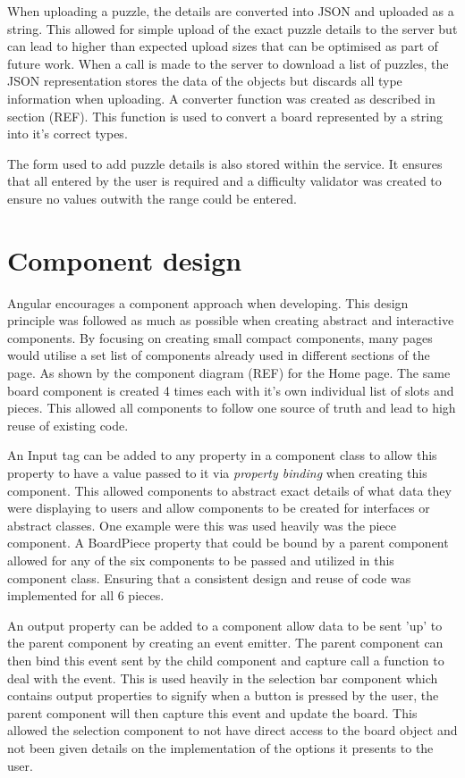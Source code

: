 \documentclass{l4proj}
\begin{document}
When uploading a puzzle, the details are converted into JSON and uploaded as a string. This allowed for simple upload of the exact puzzle details to the server but can lead to higher than expected upload sizes that can be optimised as part of future work. When a call is made to the server to download a list of puzzles, the JSON representation stores the data of the objects but discards all type information when uploading. A converter function was created as described in section (REF). This function is used to convert a board represented by a string into it's correct types.

The form used to add puzzle details is also stored within the service. It ensures that all entered by the user is required and a difficulty validator was created to ensure no values outwith the range could be entered. 

\section{Component design}
Angular encourages a component approach when developing. This design principle was followed as much as possible when creating abstract and interactive components. By focusing on creating small compact components, many pages would utilise a set list of components already used in different sections of the page. As shown by the component diagram (REF) for the Home page. The same board component is created 4 times each with it's own individual list of slots and pieces. This allowed all components to follow one source of truth and lead to high reuse of existing code. 

An Input tag can be added to any property in a component class to allow this property to have a value passed to it via \emph{property binding} when creating this component. This allowed components to abstract exact details of what data they were displaying to users and allow components to be created for interfaces or abstract classes. One example were this was used heavily was the piece component. A BoardPiece property that could be bound by a parent component allowed for any of the six components to be passed and utilized in this component class. Ensuring that a consistent design and reuse of code was implemented for all 6 pieces. 

An output property can be added to a component allow data to be sent 'up' to the parent component by creating an event emitter. The parent component can then bind this event sent by the child component and capture call a function to deal with the event. This is used heavily in the selection bar component which contains output properties to signify when a button is pressed by the user, the parent component will then capture this event and update the board. This allowed the selection component to not have direct access to the board object and not been given details on the implementation of the options it presents to the user. 
\end{document}
